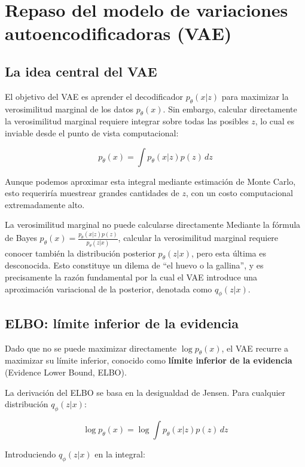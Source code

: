 \section{Repaso del modelo de variaciones autoencodificadoras (VAE)}

\subsection{La idea central del VAE}

El objetivo del VAE es aprender el decodificador $p_\theta(x|z)$ para maximizar la verosimilitud marginal de los datos $p_\theta(x)$. Sin embargo, calcular directamente la verosimilitud marginal requiere integrar sobre todas las posibles $z$, lo cual es inviable desde el punto de vista computacional:

$$p_\theta(x) = \int p_\theta(x|z) p(z) \, dz$$

Aunque podemos aproximar esta integral mediante estimación de Monte Carlo, esto requeriría muestrear grandes cantidades de $z$, con un costo computacional extremadamente alto.

\begin{warningbox}{La verosimilitud marginal no puede calcularse directamente}
Mediante la fórmula de Bayes $p_\theta(x) = \frac{p_\theta(x|z) p(z)}{p_\theta(z|x)}$, calcular la verosimilitud marginal requiere conocer también la distribución posterior $p_\theta(z|x)$, pero esta última es desconocida. Esto constituye un dilema de ``el huevo o la gallina'', y es precisamente la razón fundamental por la cual el VAE introduce una aproximación variacional de la posterior, denotada como $q_\phi(z|x)$.
\end{warningbox}

\subsection{ELBO: límite inferior de la evidencia}

Dado que no se puede maximizar directamente $\log p_\theta(x)$, el VAE recurre a maximizar su límite inferior, conocido como \textbf{límite inferior de la evidencia} (Evidence Lower Bound, ELBO).

La derivación del ELBO se basa en la desigualdad de Jensen. Para cualquier distribución $q_\phi(z|x)$:

$$\log p_\theta(x) = \log \int p_\theta(x|z) p(z) \, dz$$

Introduciendo $q_\phi(z|x)$ en la integral:

